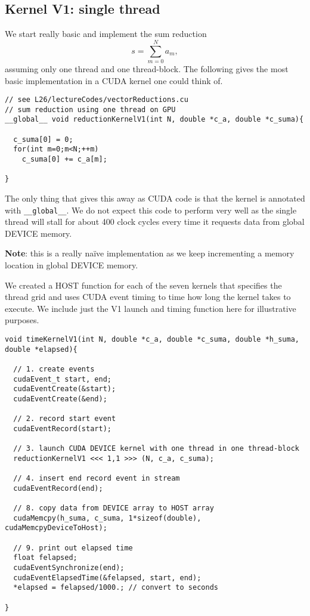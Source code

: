 \subsection{Kernel  V1: single thread}

We start really basic and implement the sum reduction
\[
s = \sum\limits_{m=0}^{N} a_m,
\]
assuming only one thread and one thread-block. The following gives the most basic implementation in a CUDA kernel one could think of.
\begin{verbatim}
// see L26/lectureCodes/vectorReductions.cu
// sum reduction using one thread on GPU
__global__ void reductionKernelV1(int N, double *c_a, double *c_suma){

  c_suma[0] = 0;
  for(int m=0;m<N;++m)
    c_suma[0] += c_a[m];

}
\end{verbatim}
The only thing that gives this away as CUDA code is that the kernel is annotated with \texttt{\_\_global\_\_}. We do not expect this code to perform very well as the single thread will stall for about 400 clock cycles every time it requests data from global DEVICE memory.

{\bf Note}: this is a really na\"{i}ve implementation as we keep incrementing a memory location in global DEVICE memory.

We created a HOST function for each of the seven kernels that specifies the thread grid and uses CUDA event timing to time how long the kernel takes to execute. We include just the V1 launch and timing function here for illustrative purposes.

\begin{verbatim}
void timeKernelV1(int N, double *c_a, double *c_suma, double *h_suma, double *elapsed){

  // 1. create events
  cudaEvent_t start, end;
  cudaEventCreate(&start);
  cudaEventCreate(&end);

  // 2. record start event
  cudaEventRecord(start);

  // 3. launch CUDA DEVICE kernel with one thread in one thread-block
  reductionKernelV1 <<< 1,1 >>> (N, c_a, c_suma);

  // 4. insert end record event in stream
  cudaEventRecord(end);

  // 8. copy data from DEVICE array to HOST array
  cudaMemcpy(h_suma, c_suma, 1*sizeof(double), cudaMemcpyDeviceToHost);

  // 9. print out elapsed time
  float felapsed;
  cudaEventSynchronize(end);
  cudaEventElapsedTime(&felapsed, start, end);
  *elapsed = felapsed/1000.; // convert to seconds

}
\end{verbatim}

